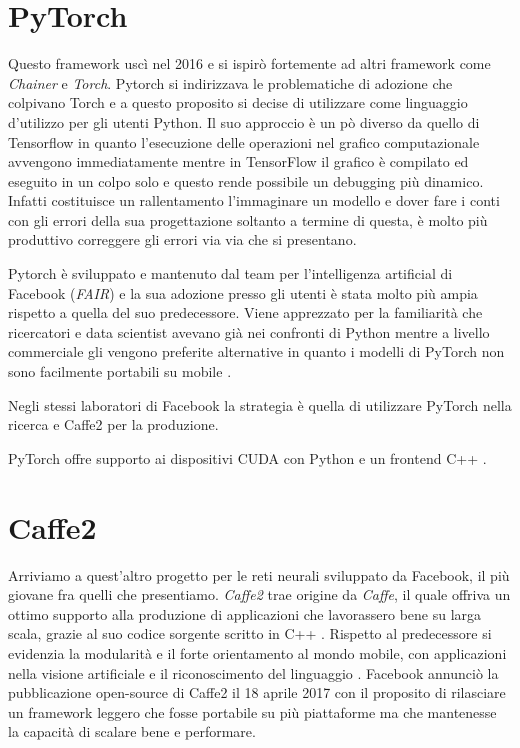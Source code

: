 \section{PyTorch}
Questo framework uscì nel 2016 e si ispirò fortemente ad altri framework come \textit{Chainer} e \textit{Torch}. Pytorch si indirizzava le problematiche di adozione che colpivano Torch e a questo proposito si decise di utilizzare come linguaggio d'utilizzo per gli utenti Python. Il suo approccio è un pò diverso da quello di Tensorflow in quanto l'esecuzione delle operazioni nel grafico computazionale avvengono immediatamente mentre in TensorFlow il grafico è compilato ed eseguito in un colpo solo e questo rende possibile un debugging più dinamico. Infatti costituisce un rallentamento l'immaginare un modello e dover fare i conti con gli errori della sua progettazione soltanto a termine di questa, è molto più produttivo correggere gli errori via via che si presentano. 

Pytorch è sviluppato e mantenuto dal team per l'intelligenza artificial di Facebook (\textit{FAIR}) e la sua adozione presso gli utenti è stata molto più ampia rispetto a quella del suo predecessore. Viene apprezzato per la familiarità che ricercatori e data scientist avevano già nei confronti di Python mentre a livello commerciale gli vengono preferite alternative in quanto i modelli di PyTorch non sono facilmente portabili su mobile \cite{oreilly:pytorch_intro}.

Negli stessi laboratori di Facebook la strategia è quella di utilizzare PyTorch nella ricerca e Caffe2 per la produzione.

PyTorch offre supporto ai dispositivi CUDA con Python e un frontend C++ \cite{pytorch:docs}.

\section{Caffe2}
Arriviamo a quest'altro progetto per le reti neurali sviluppato da Facebook, il più giovane fra quelli che presentiamo. \textit{Caffe2} trae origine da \textit{Caffe}, il quale offriva un ottimo supporto alla produzione di applicazioni che lavorassero bene su larga scala, grazie al suo codice sorgente scritto in C++ \cite{caffe_intro}. Rispetto al predecessore si evidenzia la modularità e il forte orientamento al mondo mobile, con applicazioni nella visione artificiale e il riconoscimento del linguaggio \cite{wiki:caffe2}. Facebook annunciò la pubblicazione open-source di Caffe2 il 18 aprile 2017 con il proposito di rilasciare un framework leggero che fosse portabile su più piattaforme ma che mantenesse la capacità di scalare bene e performare\cite{caffe_announcement}.

